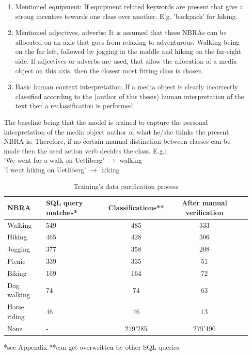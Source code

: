 \begin{enumerate}
    \item Mentioned equipment: If equipment related keywords are present that give a strong incentive towards one class over another. E.g. 'backpack' for hiking.
    \item Mentioned adjectives, adverbs: It is assumed that these NBRAs can be allocated on an axis that goes from relaxing to adventurous. Walking being on the far left, followed by jogging in the middle and hiking on the far-right side. If adjectives or adverbs are used, that allow the allocation of a media object on this axis, then the closest most fitting class is chosen.
    \item Basic human context interpretation: If a media object is clearly incorrectly classified according to the (author of this thesis) human interpretation of the text then a reclassification is performed.
\end{enumerate}

The baseline being that the model is trained to capture the personal interpretation of the media object author of what he/she thinks the present NBRA is. Therefore, if no certain manual distinction between classes can be made then the used action verb decides the class. E.g.:\\
'We went for a walk on Uetliberg' $\to$ walking \\
'I went hiking on Uetliberg' $\to$ hiking\\

\begin{table}[ht]
\begin{center}
\caption{Training's data purification process}\vspace{1ex}
\label{tab:trainingsdata}
\begin{tabular}{llccc}\hline
NBRA & SQL query matches* & Classifications** & After manual verification \\ \hline
Walking & 549 & 485 & 333 \\
Hiking & 465 & 428 & 306 \\
Jogging & 377 & 358 & 208 \\
Picnic & 339 & 335 & 51 \\
Biking & 169 & 164 & 72 \\
Dog walking & 74 & 74 & 63 \\
Horse riding & 46 & 46 & 13 \\
None & - & 279'285 & 279'490 \\ \hline
\end{tabular}
\newline
*see Appendix **can get overwritten by other SQL queries
\end{center}
\end{table}

